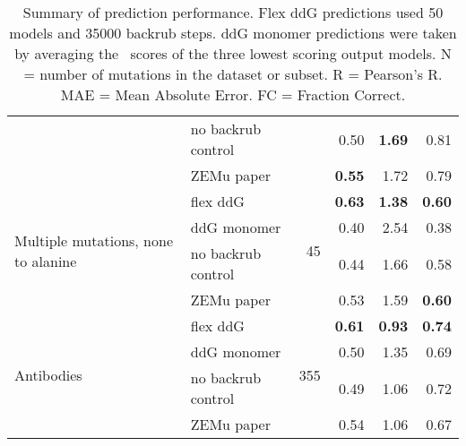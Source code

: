 \begin{table}
\begin{tabular}{llrrrr}
 & no backrub control & & 0.50 & \textbf{1.69} & 0.81  \\
 & ZEMu paper & & \textbf{0.55} & 1.72 & 0.79  \\
\hline
 \multirow{ 4}{*}{Multiple mutations, none to alanine} & flex ddG & \multirow{ 4}{*}{45} & \textbf{0.63} & \textbf{1.38} & \textbf{0.60}  \\
 & ddG monomer & & 0.40 & 2.54 & 0.38  \\
 & no backrub control & & 0.44 & 1.66 & 0.58  \\
 & ZEMu paper & & 0.53 & 1.59 & \textbf{0.60}  \\
\hline
 \multirow{ 4}{*}{Antibodies} & flex ddG & \multirow{ 4}{*}{355} & \textbf{0.61} & \textbf{0.93} & \textbf{0.74}  \\
 & ddG monomer & & 0.50 & 1.35 & 0.69  \\
 & no backrub control & & 0.49 & 1.06 & 0.72  \\
 & ZEMu paper & & 0.54 & 1.06 & 0.67  \\
\bottomrule
\end{tabular}
  \caption[]{
    Summary of prediction performance. Flex ddG predictions used 50 models and 35000 backrub steps. ddG monomer predictions were taken by averaging the \ddg\ scores of the three lowest scoring output models. N = number of mutations in the dataset or subset. R = Pearson's R. MAE = Mean Absolute Error. FC = Fraction Correct.
  } \label{tab:table-main}
\end{table}
